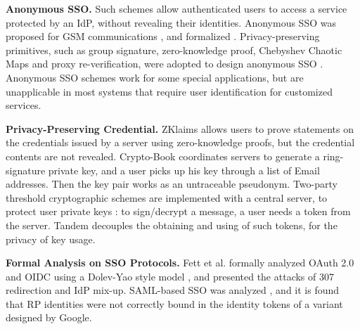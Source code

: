 \noindent\textbf{Anonymous SSO.}
Such schemes allow authenticated users to access a service protected by an IdP,
    without revealing their identities.
Anonymous SSO was proposed for GSM communications \cite{ElmuftiWRR08},
    and formalized \cite{WangWS13}.
Privacy-preserving primitives, such as group signature, zero-knowledge proof, Chebyshev Chaotic Maps and proxy re-verification,
     were adopted to design anonymous SSO \cite{WangWS13,HanCSTW18,Lee18,HanCSTWW20}.
Anonymous SSO schemes work for some special applications,
    but are unapplicable in most systems that require user identification for customized services.

\noindent\textbf{Privacy-Preserving Credential.}
ZKlaims \cite{zklaim} allows users to prove statements on the credentials issued by a server
    using zero-knowledge proofs,
        but the credential contents are not revealed.
Crypto-Book \cite{crypto-book} coordinates servers to generate a ring-signature private key,
 and a user picks up his key through a list of Email addresses. %
 Then the key pair works as an untraceable pseudonym. %
Two-party threshold cryptographic schemes are implemented with a central server,
    to protect user private keys \cite{mRSA,ss-rsa}:
    to sign/decrypt a message, a user needs a token from the server.
    Tandem \cite{tandem} decouples the obtaining and using of such tokens,
for the privacy of key usage.


\noindent\textbf{Formal Analysis on SSO Protocols.}
Fett et al. \cite{FettKS16, FettKS17} formally analyzed OAuth 2.0 and OIDC using a Dolev-Yao style model \cite{FettKS14},
    and presented the attacks of 307 redirection and IdP mix-up.
SAML-based SSO was analyzed \cite{ArmandoCCCT08},
    and it is found that RP identities were not correctly bound in the identity tokens of a variant designed by Google.



